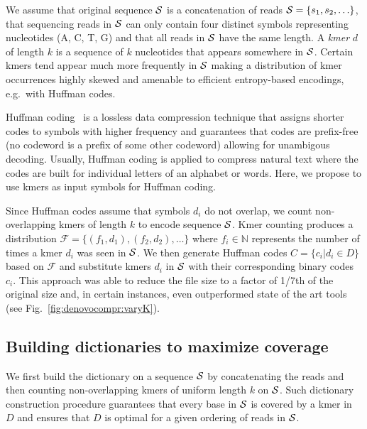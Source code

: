 \documentclass[12pt]{cmuthesis}
\makeatletter
\newcommand{\eg}{e.g.\@}
\makeatother
\begin{document}
We assume that original sequence $\mathcal{S}$ is a concatenation of reads $\mathcal{S} = \{s_1, s_2, \ldots \}$, that sequencing reads in $\mathcal{S}$ can only contain four distinct symbols representing nucleotides (A, C, T, G) and that all reads in $\mathcal{S}$ have the same length. A \textit{kmer} $d$ of length $k$ is a sequence of $k$ nucleotides that appears somewhere in $\mathcal{S}$. 
Certain kmers tend appear much more frequently in $\mathcal{S}$ making a distribution of kmer occurrences highly skewed and amenable to efficient entropy-based encodings, \eg~with Huffman codes.

Huffman coding~\cite{Huffman1952} is a lossless data compression technique that assigns shorter codes to symbols with higher frequency and guarantees that codes are prefix-free (no codeword is a prefix of some other codeword) allowing for unambigous decoding. 
Usually, Huffman coding is applied to compress natural text where the codes are built for individual letters of an alphabet or words. Here, we propose to use kmers as input symbols for Huffman coding.

Since Huffman codes assume that symbols $d_i$ do not overlap, we count non-overlapping kmers of length $k$ to encode sequence $\mathcal{S}$. Kmer counting produces a distribution $\mathcal{F} = \{(f_1, d_1), (f_2, d_2), \ldots \}$ where $f_i \in \mathbb{N}$ represents the number of times a kmer $d_i$ was seen in $\mathcal{S}$. We then generate Huffman codes $C = \{ c_i | d_i \in D \}$ based on $\mathcal{F}$ and substitute kmers $d_i$ in $\mathcal{S}$ with their corresponding binary codes $c_i$. 
This approach was able to reduce the file size to a factor of 1/7th of the original size and, in certain instances, even outperformed state of the art tools (see Fig.~\ref{fig:denovocompr:varyK}).


  \subsection{Building dictionaries to maximize coverage}

  We first build the dictionary on a sequence $\mathcal{S}$ by concatenating the reads and then counting non-overlapping kmers of uniform length $k$ on $\mathcal{S}$. Such dictionary construction procedure guarantees that every base in $\mathcal{S}$ is covered by a kmer in $D$ and ensures that $D$ is optimal for a given ordering of reads in $\mathcal{S}$.
\end{document}
